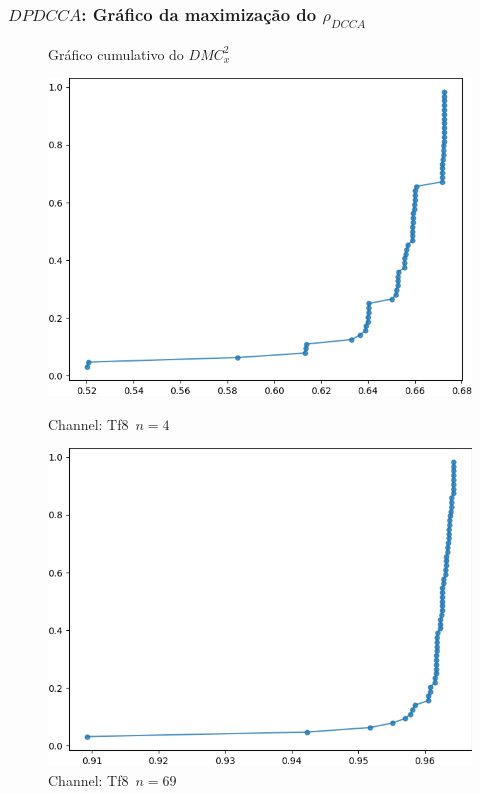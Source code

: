 \documentclass[11pt, aspectratio=169]{beamer}
\newcommand{\dmc}{\(DMC_x^2\) }
\newcommand{\pdcca}{\({\rho}_{DCCA}\) }
\begin{document}
\begin{frame}

  \frametitle{$DPDCCA$: Gráfico da maximização do \pdcca}
\begin{figure}[ht]
  \caption{Gráfico cumulativo do \dmc}
  \begin{minipage}[b]{0.45\textwidth}
    \includegraphics[width=\textwidth]{../Figures/test_dmc/pdcca_of_T8.._n_4.png}
    \caption{Channel: Tf8~$n = 4$}
  \end{minipage}
  \hfill
  \begin{minipage}[b]{0.45\textwidth}
    \includegraphics[width=\textwidth]{../Figures/test_dmc/pdcca_of_T8.._n_69.png}
    \caption{Channel: Tf8~$n = 69$}
  \end{minipage}
\end{figure}
\end{frame}
\end{document}
